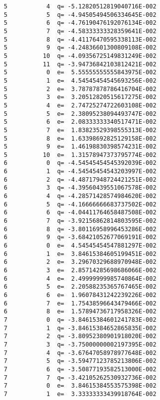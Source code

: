 \documentclass{article}
\begin{document}
\begin{verbatim}
           5           4  q= -5.12820512819040716E-002
           5           5  q= -4.94505494506334645E-002
           5           6  q= -4.76190476192076134E-002
           5           7  q= -4.58333333328359641E-002
           5           8  q= -4.41176470595338113E-002
           5           9  q= -4.24836601300809108E-002
           5          10  q= -4.09356725149831249E-002
           5          11  q= -3.94736842103812421E-002
           5           0  e=  5.55555555555843975E-002
           5           1  e=  4.54545454545693256E-002
           5           2  e=  3.78787878786416704E-002
           5           3  e=  3.20512820515617275E-002
           5           4  e=  2.74725274722603108E-002
           5           5  e=  2.38095238094493747E-002
           5           6  e=  2.08333333340517471E-002
           5           7  e=  1.83823529398555313E-002
           5           8  e=  1.63398692825129158E-002
           5           9  e=  1.46198830398574231E-002
           5          10  e=  1.31578947373795774E-002
           6           0  q= -4.54545454545392039E-002
           6           1  q= -4.54545454543203997E-002
           6           2  q= -4.48717948724421251E-002
           6           3  q= -4.39560439551067578E-002
           6           4  q= -4.28571428574984620E-002
           6           5  q= -4.16666666683737502E-002
           6           6  q= -4.04411764658487508E-002
           6           7  q= -3.92156862814803595E-002
           6           8  q= -3.80116958996453286E-002
           6           9  q= -3.68421052677069191E-002
           6           0  e=  4.54545454547881297E-002
           6           1  e=  3.84615384605199451E-002
           6           2  e=  3.29670329688970948E-002
           6           3  e=  2.85714285698686066E-002
           6           4  e=  2.49999999985740864E-002
           6           5  e=  2.20588235365767465E-002
           6           6  e=  1.96078431242239226E-002
           6           7  e=  1.75438596643479466E-002
           6           8  e=  1.57894736717958326E-002
           7           0  q= -3.84615384601241783E-002
           7           1  q= -3.84615384652865835E-002
           7           2  q= -3.80952380901918020E-002
           7           3  q= -3.75000000002197395E-002
           7           4  q= -3.67647058978977648E-002
           7           5  q= -3.59477123785213806E-002
           7           6  q= -3.50877193582513000E-002
           7           7  q= -3.42105262530932736E-002
           7           0  e=  3.84615384553575398E-002
           7           1  e=  3.33333333439918764E-002

\end{verbatim}
\end{document}
